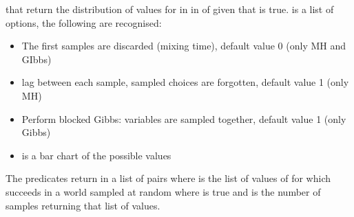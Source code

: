 \documentclass[letterpaper,10pt,english]{sphinxmanual}
\begin{document}
\sphinxAtStartPar
that return the distribution of values for  in  in  of  given that  is true.  is a list of options, the following are recognised:
\begin{itemize}
\item {} 
\sphinxAtStartPar
{} The first  samples are discarded (mixing time), default value 0 (only MH and GIbbs)

\item {} 
\sphinxAtStartPar
{} lag between each sample,  sampled choices are forgotten, default value 1 (only MH)

\item {} 
\sphinxAtStartPar
{} Perform blocked Gibbs:  variables are sampled together, default value 1 (only Gibbs)

\item {} 
\sphinxAtStartPar
{}  is a bar chart of the possible values

\end{itemize}

\sphinxAtStartPar
The predicates return in  a list of pairs  where  is the list of values of  for which  succeeds in a world sampled at random where  is true and  is the number of samples returning that list of values.

\begin{sphinxVerbatim}[commandchars=\\\{\}]
  
\end{sphinxVerbatim}
\end{document}
